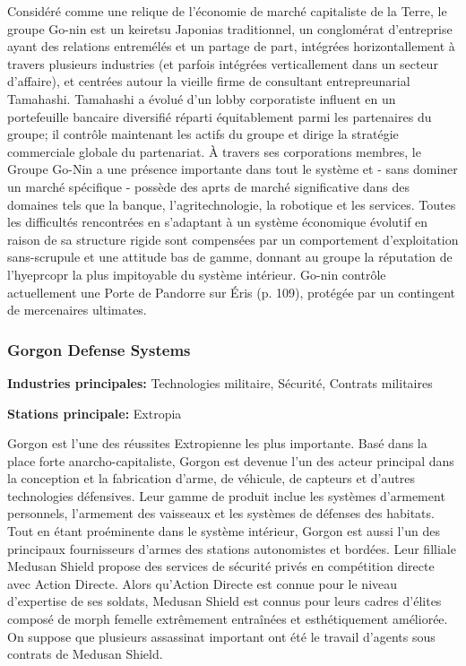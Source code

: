                      Considéré comme une relique de l'économie de marché capitaliste de la Terre, le groupe Go-nin est un keiretsu Japonias traditionnel, un conglomérat d'entreprise ayant des relations entremélés et un partage de part, intégrées horizontallement à travers plusieurs industries (et parfois intégrées verticallement dans un secteur d'affaire), et centrées autour la vieille firme de consultant entrepreunarial Tamahashi. Tamahashi a évolué d'un lobby corporatiste influent en un portefeuille bancaire diversifié réparti équitablement parmi les partenaires du groupe; il contrôle maintenant les actifs du groupe et dirige la stratégie commerciale globale du partenariat. À travers ses corporations membres, le Groupe Go-Nin a une présence importante dans tout le système et - sans dominer un marché spécifique - possède des aprts de marché significative dans des domaines tels que la banque, l'agritechnologie, la robotique et les services. Toutes les difficultés rencontrées en s'adaptant à un système économique évolutif en raison de sa structure rigide sont compensées par un comportement d'exploitation sans-scrupule et une attitude bas de gamme, donnant au groupe la réputation de l'hyeprcopr la plus impitoyable du système intérieur. Go-nin contrôle actuellement une Porte de Pandorre sur Éris (p. 109), protégée par un contingent de mercenaires ultimates. 

                     \subsubsection{Gorgon Defense Systems} \label{sec:gorg-defense-syst} 

                     \textbf{Industries principales:} Technologies militaire, Sécurité, Contrats militaires 

                     \textbf{Stations principale:} Extropia 

                     Gorgon est l'une des réussites Extropienne les plus importante. Basé dans la place forte anarcho-capitaliste, Gorgon est devenue l'un des acteur principal dans la conception et la fabrication d'arme, de véhicule, de capteurs et d'autres technologies défensives. Leur gamme de produit inclue les systèmes d'armement personnels, l'armement des vaisseaux et les systèmes de défenses des habitats. Tout en étant proéminente dans le système intérieur, Gorgon est aussi l'un des principaux fournisseurs d'armes des stations autonomistes et bordées. Leur filliale Medusan Shield propose des services de sécurité privés en compétition directe avec Action Directe. Alors qu'Action Directe est connue pour le niveau d'expertise de ses soldats, Medusan Shield est connus pour leurs cadres d'élites composé de morph femelle extrêmement entraînées et esthétiquement améliorée. On suppose que plusieurs assassinat important ont été le travail d'agents sous contrats de Medusan Shield. 

